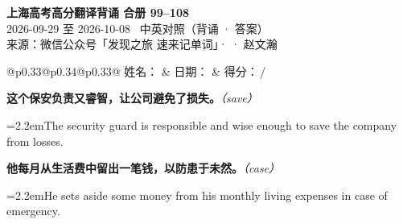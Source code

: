 \documentclass[11pt,a4paper]{article}
\newcommand{\num}[1]{\makebox[1.9em][r]{#1.}\hspace{0.3em}}
\newcommand{\prompt}[1]{\emph{\textcolor{tipblue}{\small（#1）}}}
\begin{document}
\pagestyle{plain}
\begin{center}
{\LARGE\bfseries 上海高考高分翻译背诵 \quad 合册 99–108}\\[0.25em]
{\large 2026-09-29 至 2026-10-08 \quad\ 中英对照（背诵 · 答案）}\\[0.35em]
{\footnotesize 来源：微信公众号「发现之旅 速来记单词」·  · 赵文瀚}
\end{center}

\vspace{0.4em}
\noindent\begin{tabular}{@{}p{0.33\textwidth}@{}p{0.34\textwidth}@{}p{0.33\textwidth}@{}}
姓名：\underline{\hspace{2.0cm}} & 日期：\underline{\hspace{2.0cm}} & 得分：\underline{\hspace{1.4cm}}\,/ \\
\end{tabular}

\vspace{0.5em}

\vspace{0.8em}
\vspace{0.35em}\vspace{0.15em}

\begin{minipage}{\linewidth}

\num{1}\textbf{这个保安负责又睿智，让公司避免了损失。}\prompt{save}

\vspace{0.15em}

\noindent\hangindent=2.2em\hspace{2.2em}The security guard is responsible and wise enough to save the company from losses.

\end{minipage}

\begin{minipage}{\linewidth}

\num{2}\textbf{他每月从生活费中留出一笔钱，以防患于未然。}\prompt{case}

\vspace{0.15em}

\noindent\hangindent=2.2em\hspace{2.2em}He sets  aside some money from his monthly living expenses in case of emergency.

\end{minipage}
\end{document}
